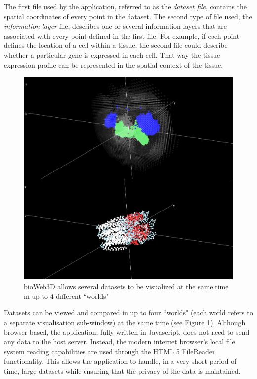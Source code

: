 The first file used by the application, referred to as the \emph{dataset file}, contains the spatial coordinates of every point in the dataset. The second type of file used, the \emph{information layer} file, describes one or several information layers that are associated with every point defined in the first file. For example, if each point defines the location of a cell within a tissue, the second file could describe whether a particular gene is expressed in each cell. That way the tissue expression profile can be represented in the spatial context of the tissue.\\

\begin{figure}[bth]
\begin{center}
  \includegraphics[width=0.8\linewidth]{gfx/chapter3/two_worlds.png}
\end{center}
  \caption{bioWeb3D allows several datasets to be visualized at the same time in up to 4 different ``worlds"}
  \label{fig:2worlds}
\end{figure}

Datasets can be viewed and compared in up to four ``worlds" (each world refers to a separate visualisation sub-window) at the same time (see Figure \ref{fig:2worlds}). Although browser based, the application, fully written in Javascript, does not need to send any data to the host server. Instead, the modern internet browser's local file system reading capabilities are used through the HTML 5 FileReader functionality. This allows the application to handle, in a very short period of time, large datasets while ensuring that the privacy of the data is maintained.\\

